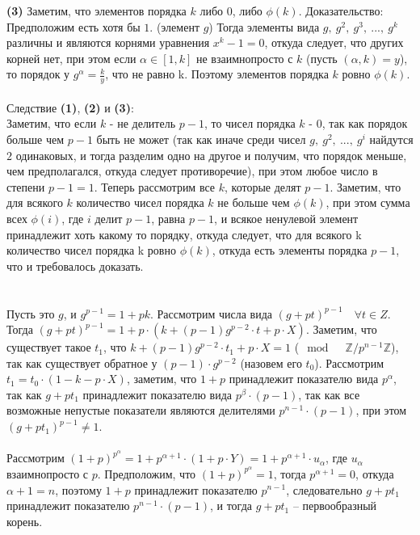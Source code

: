 		\textbf{(3)} Заметим, что элементов порядка $k$ либо $0$, либо $\phi(k)$. Доказательство:\\
		Предположим есть хотя бы $1$. (элемент $g$) Тогда элементы вида $g,\ g^2,\ g^3,\ ... ,\ g^k$ различны и являются корнями уравнения $x^k - 1 = 0$, откуда следует, что других корней нет, при этом если $\alpha \in [1,k]$ не взаимнопросто с $k$ (пусть $(\alpha,k) = y$), то порядок у $g^{\alpha} = \frac{k}{y}$, что не равно k. Поэтому элементов порядка $k$ ровно $\phi(k)$.\\
		\\
		Следствие \textbf{(1)}, \textbf{(2)} и \textbf{(3)}:\\
		Заметим, что если $k$ - не делитель $p-1$, то чисел порядка $k$ - 0, так как порядок больше чем $p-1$ быть не может (так как иначе среди чисел $g,\ g^2,\ ...,\ g^i$ найдутся $2$ одинаковых, и тогда разделим одно на другое и получим, что порядок меньше, чем предполагался, откуда следует противоречие), при этом любое число в степени $p-1 = 1$. Теперь рассмотрим все $k$, которые делят $p-1$. Заметим, что для всякого $k$ количество чисел порядка $k$ не больше чем $\phi(k)$, при этом сумма всех $\phi(i)$, где $i$ делит $p-1$, равна $p-1$, и всякое ненулевой элемент принадлежит хоть какому то порядку, откуда следует, что для всякого k количество чисел порядка k ровно $\phi(k)$, откуда есть элементы порядка $p-1$, что и требовалось доказать.\\
		\\ \\
		Пусть это $g$, и $g^{p-1} = 1 + pk$. Рассмотрим числа вида $(g + pt)^{p-1} \quad \forall t \in Z$. Тогда $(g + pt)^{p-1} = 1 + p \cdot (k + (p-1)g^{p-2} \cdot t + p \cdot X)$. Заметим, что существует такое $t_1$, что $k + (p-1)g^{p-2} \cdot t_1 + p \cdot X = 1$ ($\mod \quad \mathbb{Z}/p^{n-1} \mathbb{Z}$), так как существует обратное у $(p-1) \cdot g^{p-2}$ (назовем его $t_0$). Рассмотрим $t_1 = t_0 \cdot (1 - k - p \cdot X)$, заметим, что $1+p$ принадлежит показателю вида $p^\alpha$, так как $g + pt_1$ принадлежит показателю вида $p^\beta \cdot (p-1)$, так как все возможные непустые показатели являются делителями $p^{n-1} \cdot (p-1)$, при этом $(g + pt_1)^{p-1} \ne 1$. \\ \\
		Рассмотрим $(1+p) ^{p^{\alpha}} = 1 + p^{\alpha + 1} \cdot (1 + p \cdot Y) = 1 + p^{\alpha + 1} \cdot u_{\alpha}$, где $u_{\alpha}$ взаимнопросто с $p$. Предположим, что $(1+p) ^{p^{\alpha}} = 1$, тогда $p^{\alpha + 1} = 0$, откуда $\alpha + 1 = n$, поэтому $1 + p$ принадлежит показателю $p^{n-1}$, следовательно $g + pt_1$ принадлежит показателю $p^{n-1} \cdot (p-1)$, и тогда $g + pt_1$ -- первообразный корень.\\
		\\
